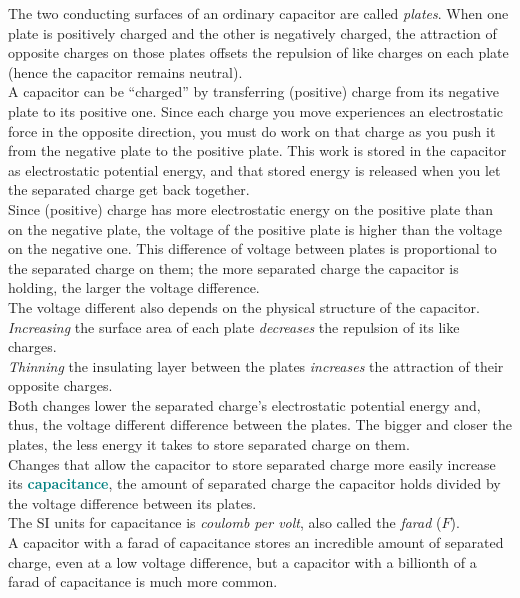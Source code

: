 \documentclass[12pt]{article}
\theoremstyle{definition}
\newcommand{\defnterm}[1]{\textbf{\textcolor{teal}{#1}}\index{#1}}
\begin{document}
The two conducting surfaces of an ordinary capacitor are called \emph{plates}.
When one plate is positively charged and the other is negatively charged, the attraction of opposite charges on those plates offsets the repulsion of like charges on each plate (hence the capacitor remains neutral). \\

A capacitor can be ``charged'' by transferring (positive) charge from its negative plate to its positive one.
Since each charge you move experiences an electrostatic force in the opposite direction, you must do work on that charge as you push it from the negative plate to the positive plate.
This work is stored in the capacitor as electrostatic potential energy, and that stored energy is released when you let the separated charge get back together. \\
Since (positive) charge has more electrostatic energy on the positive plate than on the negative plate, the voltage of the positive plate is higher than the voltage on the negative one.
This difference of voltage between plates is proportional to the separated charge on them;
the more separated charge the capacitor is holding, the larger the voltage difference. \\

The voltage different also depends on the physical structure of the capacitor. \\
\emph{Increasing} the surface area of each plate \emph{decreases} the repulsion of its like charges. \\
\emph{Thinning} the insulating layer between the plates \emph{increases} the attraction of their opposite charges. \\
Both changes lower the separated charge's electrostatic potential energy and, thus, the voltage different difference between the plates.
The bigger and closer the plates, the less energy it takes to store separated charge on them. \\

Changes that allow the capacitor to store separated charge more easily increase its \defnterm{capacitance}, the amount of separated charge the capacitor holds divided by the voltage difference between its plates. \\
The SI units for capacitance is \emph{coulomb per volt}, also called the \emph{farad} ($F$). \\
A capacitor with a farad of capacitance stores an incredible amount of separated charge, even at a low voltage difference, but a capacitor with a billionth of a farad of capacitance is much more common. \\
\end{document}
